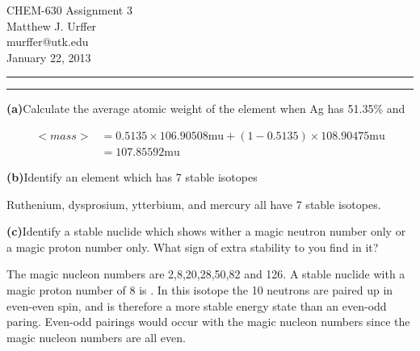 \documentclass[11pt]{article}
\makeatletter
\newcommand{\question}[2] {\vspace{.25in} \hrule\vspace{0.5em}
\noindent{\bf #1: #2} \vspace{0.5em}
\hrule \vspace{.10in}}
\renewcommand{\part}[1] {\vspace{.10in} {\bf (#1)}}
\newcommand{\myname}{Matthew J. Urffer}
\newcommand{\myemail}{murffer@utk.edu}
\newcommand{\myhwnum}{3}
\makeatother
\begin{document}
\medskip                        %

\thispagestyle{plain}
\begin{center}                  %
{\Large CHEM-630 Assignment \myhwnum} \\
\myname \\
\myemail \\
January 22, 2013 \\
\end{center}

\question{1.11}{Atoms}

\part{a}{Calculate the average atomic weight of the element when Ag has 51.35\%  and }

\begin{align}
	<mass> &= 0.5135\times106.90508\text{mu} + (1-0.5135)\times108.90475\text{mu}\\
			 &= 107.85592\text{mu}
\end{align}

\part{b}{Identify an element which has 7 stable isotopes}


Ruthenium, dysprosium, ytterbium, and mercury all have 7 stable isotopes.


\part{c}{Identify a stable nuclide which shows wither a magic neutron number only or a magic proton number only. What sign of extra stability to you find in it?}


The magic nucleon numbers are 2,8,20,28,50,82 and 126.
A stable nuclide with a magic proton number of 8 is .  
In this isotope the 10 neutrons are paired up in even-even spin, and is therefore a more stable energy state than an even-odd paring.
Even-odd pairings would occur with the magic nucleon numbers since the magic nucleon numbers are all even.
\end{document}
